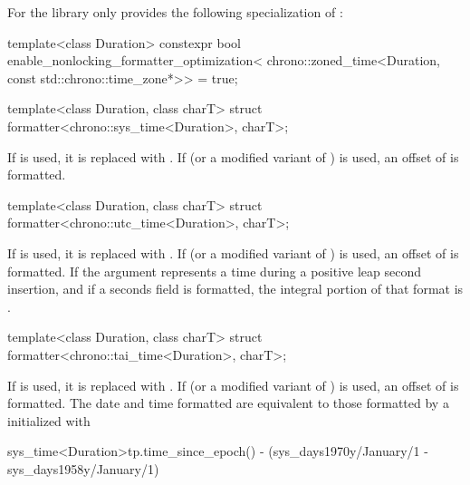 \pnum
For 
the library only provides the following specialization of
:
\begin{codeblock}
template<class Duration>
  constexpr bool enable_nonlocking_formatter_optimization<
    chrono::zoned_time<Duration, const std::chrono::time_zone*>> = true;
\end{codeblock}

%
\begin{itemdecl}
template<class Duration, class charT>
  struct formatter<chrono::sys_time<Duration>, charT>;
\end{itemdecl}

\begin{itemdescr}
\pnum
\remarks
If  is used,
it is replaced with .
If  (or a modified variant of ) is used,
an offset of  is formatted.
\end{itemdescr}

%
\begin{itemdecl}
template<class Duration, class charT>
  struct formatter<chrono::utc_time<Duration>, charT>;
\end{itemdecl}

\begin{itemdescr}
\pnum
\remarks
If  is used,
it is replaced with .
If  (or a modified variant of ) is used,
an offset of  is formatted.
If the argument represents a time during a positive leap second insertion,
and if a seconds field is formatted,
the integral portion of that format is
.
\end{itemdescr}

%
\begin{itemdecl}
template<class Duration, class charT>
  struct formatter<chrono::tai_time<Duration>, charT>;
\end{itemdecl}

\begin{itemdescr}
\pnum
\remarks
If  is used,
it is replaced with .
If  (or a modified variant of ) is used,
an offset of  is formatted.
The date and time formatted are equivalent to
those formatted by a  initialized with
\begin{codeblock}
sys_time<Duration>{tp.time_since_epoch()} -
  (sys_days{1970y/January/1} - sys_days{1958y/January/1})
\end{codeblock}
\end{itemdescr}

